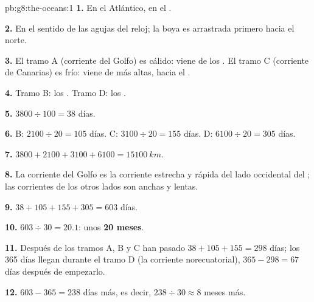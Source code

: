 \begin{solution}{pb:g8:the-oceans:1}
\textbf{1.} En el  Atlántico, en el .

\textbf{2.} En el sentido de las agujas del reloj; la boya es arrastrada primero hacia el norte.

\textbf{3.} El tramo A (corriente del Golfo) es cálido: viene de los
. El tramo C (corriente de Canarias) es frío: viene de 
más altas, hacia el .

\textbf{4.} Tramo B: los . Tramo D: los .

\textbf{5.} $3800 \div 100 = 38$ días.

\textbf{6.} B: $2100 \div 20 = 105$ días. C: $3100 \div 20 = 155$ días.
D: $6100 \div 20 = 305$ días.

\textbf{7.} $3800 + 2100 + 3100 + 6100 = \qty{15100}{km}$.

\textbf{8.} La corriente del Golfo es la corriente estrecha y rápida del
lado occidental del ; las corrientes de los otros lados son anchas y
lentas.

\textbf{9.} $38 + 105 + 155 + 305 = 603$ días.

\textbf{10.} $603 \div 30 = 20.1$: unos \textbf{20 meses}.

\textbf{11.} Después de los tramos A, B y C han pasado
$38 + 105 + 155 = 298$ días; los 365 días llegan durante el tramo D (la
corriente norecuatorial), $365 -
298 = 67$ días después de empezarlo.

\textbf{12.} $603 - 365 = 238$ días más, es decir, $238 \div 30 \approx 8$
meses más.
\end{solution}
